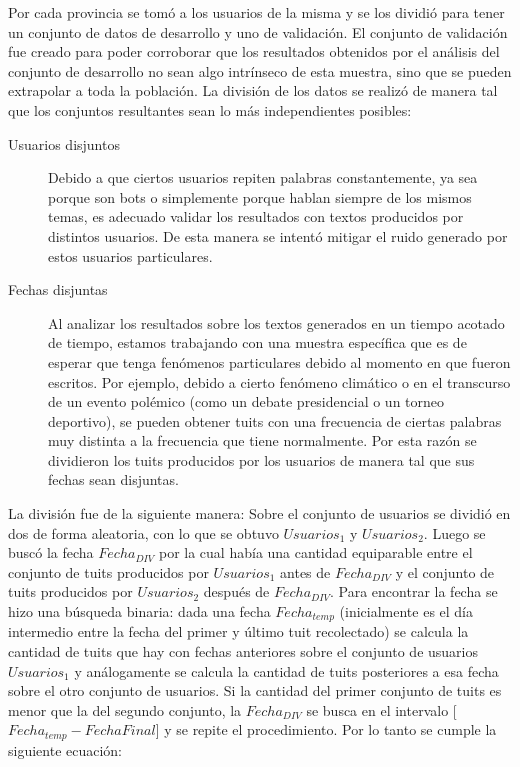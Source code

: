 Por cada provincia se tomó a los usuarios de la misma y se los dividió para tener un conjunto de datos de desarrollo y uno de validación. El conjunto de validación fue creado para poder corroborar que los resultados obtenidos por el análisis del conjunto de desarrollo no sean algo intrínseco de esta muestra, sino que se pueden extrapolar a toda la población. 
La división de los datos se realizó de manera tal que los conjuntos resultantes sean lo más independientes posibles: 
\begin{description}
    \item [Usuarios disjuntos] Debido a que ciertos usuarios repiten palabras constantemente, ya sea porque son bots o simplemente porque hablan siempre de los mismos temas, es adecuado validar los resultados con textos producidos por distintos usuarios. De esta manera se intentó mitigar el ruido generado por estos usuarios particulares.
    \item [Fechas disjuntas] Al analizar los resultados sobre los textos generados en un tiempo acotado de tiempo, estamos trabajando con una muestra específica que es de esperar que tenga fenómenos particulares debido al momento en que fueron escritos. Por ejemplo, debido a cierto fenómeno climático o en el transcurso de un evento polémico (como un debate presidencial o un torneo deportivo), se pueden obtener tuits con una frecuencia de ciertas palabras muy distinta a la frecuencia que tiene normalmente. Por esta razón se dividieron los tuits producidos por los usuarios de manera tal que sus fechas sean disjuntas.
\end{description}

La división fue de la siguiente manera:
Sobre el conjunto de usuarios se dividió en dos de forma aleatoria, con lo que se obtuvo $Usuarios_1$ y $Usuarios_2$. Luego se buscó la fecha $Fecha_{DIV}$ por la cual había una cantidad equiparable entre el conjunto de tuits producidos por  $Usuarios_1$ antes de $Fecha_{DIV}$ y el conjunto de tuits producidos por $Usuarios_2$ después de $Fecha_{DIV}$. Para encontrar la fecha se hizo una búsqueda binaria: dada una fecha $Fecha_{temp}$ (inicialmente es el día intermedio entre la fecha del primer y último tuit recolectado) se calcula la cantidad de tuits que hay con fechas anteriores sobre el conjunto de usuarios $Usuarios_1$ y análogamente se calcula la cantidad de tuits posteriores a esa fecha sobre el otro conjunto de usuarios. Si la cantidad del primer conjunto de tuits es menor que la del segundo conjunto, la $Fecha_{DIV}$ se busca en  el intervalo [$Fecha_{temp}-FechaFinal$] y se repite el procedimiento. Por lo tanto se cumple la siguiente ecuación:

